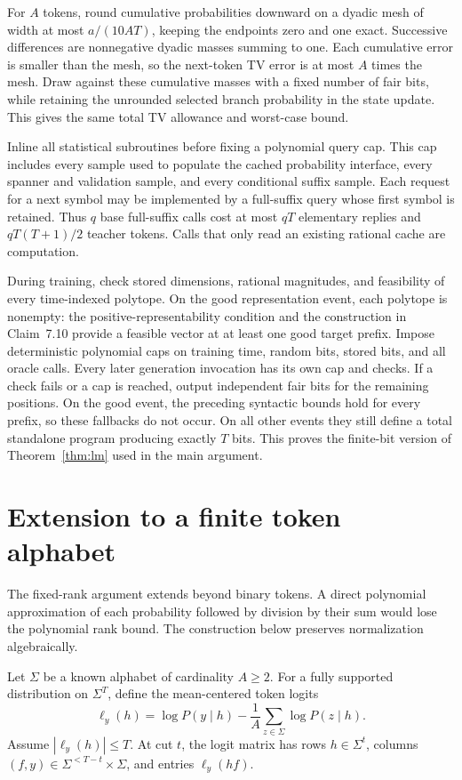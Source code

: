 \documentclass[11pt]{article}
\theoremstyle{definition}
\theoremstyle{remark}
\begin{document}
For $A$ tokens, round cumulative probabilities downward on a dyadic mesh of width at most $a/(10AT)$, keeping the endpoints zero and one exact. Successive differences are nonnegative dyadic masses summing to one. Each cumulative error is smaller than the mesh, so the next-token TV error is at most $A$ times the mesh. Draw against these cumulative masses with a fixed number of fair bits, while retaining the unrounded selected branch probability in the state update. This gives the same total TV allowance and worst-case bound.

Inline all statistical subroutines before fixing a polynomial query cap. This cap includes every sample used to populate the cached probability interface, every spanner and validation sample, and every conditional suffix sample. Each request for a next symbol may be implemented by a full-suffix query whose first symbol is retained. Thus $q$ base full-suffix calls cost at most $qT$ elementary replies and $qT(T+1)/2$ teacher tokens. Calls that only read an existing rational cache are computation.

During training, check stored dimensions, rational magnitudes, and feasibility of every time-indexed polytope. On the good representation event, each polytope is nonempty: the positive-representability condition and the construction in Claim~7.10 provide a feasible vector at at least one good target prefix. Impose deterministic polynomial caps on training time, random bits, stored bits, and all oracle calls. Every later generation invocation has its own cap and checks. If a check fails or a cap is reached, output independent fair bits for the remaining positions. On the good event, the preceding syntactic bounds hold for every prefix, so these fallbacks do not occur. On all other events they still define a total standalone program producing exactly $T$ bits. This proves the finite-bit version of Theorem~\ref{thm:lm} used in the main argument.


\section{Extension to a finite token alphabet}\label{sec:alphabet}

The fixed-rank argument extends beyond binary tokens. A direct polynomial approximation of each probability followed by division by their sum would lose the polynomial rank bound. The construction below preserves normalization algebraically.

Let $\Sigma$ be a known alphabet of cardinality $A\ge2$. For a fully supported distribution on $\Sigma^T$, define the mean-centered token logits
\[
\ell_y(h)=\log P(y\mid h)-\frac1A\sum_{z\in\Sigma}\log P(z\mid h).
\]
Assume $|\ell_y(h)|\le T$. At cut $t$, the logit matrix has rows $h\in\Sigma^t$, columns $(f,y)\in\Sigma^{<T-t}\times\Sigma$, and entries $\ell_y(hf)$.
\end{document}
